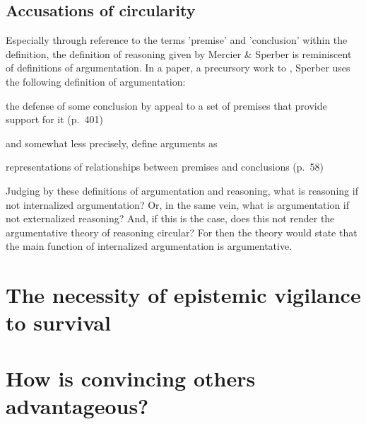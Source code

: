 \subsection{Accusations of circularity}

Especially through reference to the terms 'premise' and 'conclusion' within the definition, the definition of reasoning given by Mercier \& Sperber is reminiscent of definitions of argumentation. In a \citeyear{Sperber01} paper, a precursory work to \citet{MS11}, Sperber uses the following definition of argumentation:
\begin{quoting}
    the defense of some conclusion by appeal to a set of premises that provide support for it
    \hfill (p.~401)
\end{quoting}
and somewhat less precisely, \citet{MS11} define arguments as
\begin{quoting}
    representations of relationships between premises and conclusions
    \hfill (p.~58)
\end{quoting}

Judging by these definitions of argumentation and reasoning, what is reasoning if not internalized argumentation? Or, in the same vein, what is argumentation if not externalized reasoning? And, if this is the case, does this not render the argumentative theory of reasoning circular? For then the theory would state that the main function of internalized argumentation is argumentative.

\section{The necessity of epistemic vigilance to survival}

\section{How is convincing others advantageous?}

